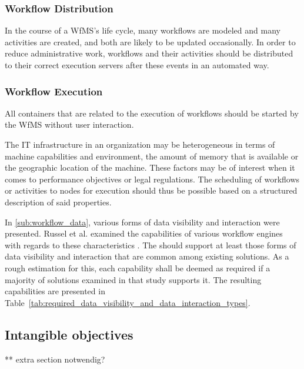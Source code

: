 
  \subsubsection{Workflow Distribution} %
    \label{ssub:workflow_distribution}
      In the course of a \ac{WfMS}'s life cycle, many workflows are modeled and many activities are created, and both are likely to be updated occasionally. In order to reduce administrative work, workflows and their activities should be distributed to their correct execution servers after these events in an automated way.


  \subsubsection{Workflow Execution} %
    \label{ssub:workflow_execution}
        All containers that are related to the execution of workflows should be started by the \ac{WfMS} without user interaction.

        The IT infrastructure in an organization may be heterogeneous in terms of machine capabilities and environment, \eg the amount of memory that is available or the geographic location of the machine. These factors may be of interest when it comes to performance objectives or legal regulations. The scheduling of workflows or activities to nodes for execution should thus be possible based on a structured description of said properties.

        In \ref{sub:workflow_data}, various forms of data visibility and interaction were presented. Russel et al. examined the capabilities of various workflow engines with regards to these characteristics \cite{Russell2005Workflow}. The should support at least those forms of data visibility and interaction that are common among existing solutions. As a rough estimation for this, each capability shall be deemed as required if a majority of solutions examined in that study supports it. The resulting capabilities are presented in Table~\ref{tab:required_data_visibility_and_data_interaction_types}.


\subsection{Intangible objectives} %
  \label{sub:intangible_objectives}
  ** extra section notwendig?

